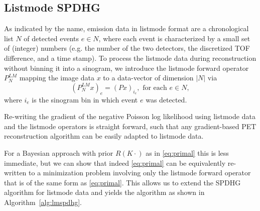 \subsection*{Listmode SPDHG}

As indicated by the name, emission data in listmode format are a chronological list $N$ of detected 
events $e \in N$, where each event is characterized by a small set of (integer) numbers 
(e.g. the number of the two detectors, the discretized TOF difference, and a time stamp).
To process the listmode data during reconstruction without binning it into a sinogram,
we introduce the listmode forward operator $P^{LM}_N$ mapping the image data $x$ to a 
data-vector of dimension $|N|$ via \[ (P^{LM}_N x)_e  = (Px)_{i_e} , \text{ for each }e \in N,\]
where $i_e$ is the sinogram bin in which event $e$ was detected.

Re-writing the gradient of the negative Poisson log likelihood using listmode data and the
listmode operators is straight forward, such that any gradient-based PET reconstruction algorithm 
can be easily adapted to listmode data.

For a Bayesian approach with prior $R(K \cdot)$ as in \eqref{eq:primal} this is less immediate, 
but we can show that indeed \eqref{eq:primal} can be equivalently re-written to a minimization 
problem involving only the listmode forward operator that is of the same form as \eqref{eq:primal}. 
This allows us to extend the SPDHG algorithm for listmode data and yields the algorithm as shown 
in Algorithm~\ref{alg:lmspdhg}.



